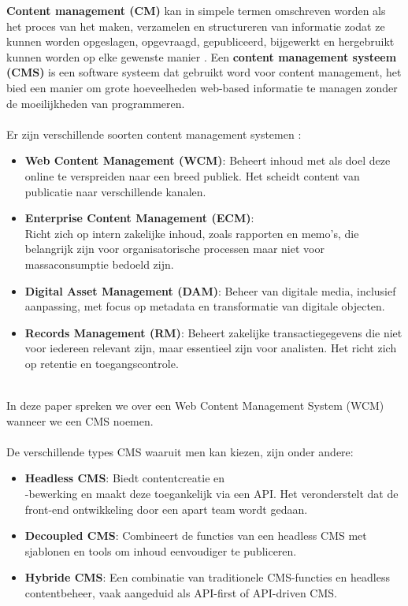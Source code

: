 \noindent
\textbf{Content management (CM)} kan in simpele termen omschreven worden als het proces van het maken, verzamelen en structureren van informatie zodat ze kunnen worden opgeslagen, opgevraagd, gepubliceerd, bijgewerkt en hergebruikt kunnen worden op elke gewenste manier \autocite{Sunny2008}. Een \textbf{content management systeem (CMS)} is een software systeem dat gebruikt word voor content management, het bied een manier om grote hoeveelheden web-based informatie te managen zonder de moeilijkheden van programmeren.
\\ \\
Er zijn verschillende soorten content management systemen \autocite{Singh2023}:
\begin{itemize}
    \item \textbf{Web Content Management (WCM)}: Beheert inhoud met als doel deze online te verspreiden naar een breed publiek. Het scheidt content van publicatie naar verschillende kanalen.
    \item \textbf{Enterprise Content Management (ECM)}:\\Richt zich op intern zakelijke inhoud, zoals rapporten en memo’s, die belangrijk zijn voor organisatorische processen maar niet voor massaconsumptie bedoeld zijn.
    \item \textbf{Digital Asset Management (DAM)}: Beheer van digitale media, inclusief aanpassing, met focus op metadata en transformatie van digitale objecten.
    \item \textbf{Records Management (RM)}: Beheert zakelijke transactiegegevens die niet voor iedereen relevant zijn, maar essentieel zijn voor analisten. Het richt zich op retentie en toegangscontrole.
\end{itemize}
\\
In deze paper spreken we over een Web Content Management System (WCM) wanneer we een CMS noemen.
\\ \\
De verschillende types CMS waaruit men kan kiezen, zijn onder andere:
\begin{itemize}
    \item \textbf{Headless CMS}: Biedt contentcreatie en\\-bewerking en maakt deze toegankelijk via een API. Het veronderstelt dat de front-end ontwikkeling door een apart team wordt gedaan.
    \item \textbf{Decoupled CMS}: Combineert de functies van een headless CMS met sjablonen en tools om inhoud eenvoudiger te publiceren.
    \item \textbf{Hybride CMS}: Een combinatie van traditionele CMS-functies en headless contentbeheer, vaak aangeduid als API-first of API-driven CMS.
\end{itemize}

